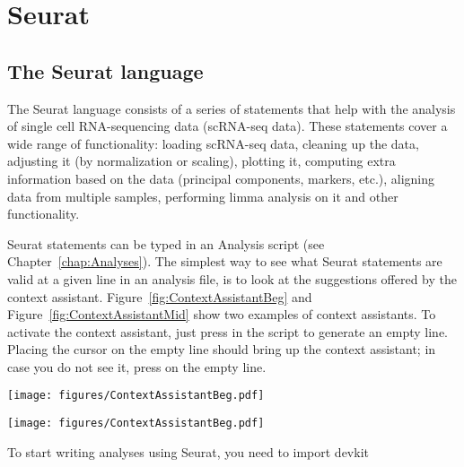 


\chapter{Seurat}\label{chap:Seurat}


\section{The Seurat language}

The Seurat language consists of a series of statements that help with the analysis of
single cell RNA-sequencing data (scRNA-seq data). These statements cover a wide range of
functionality: loading scRNA-seq data, cleaning up the data, adjusting it (by normalization
or scaling), plotting it, computing extra information based on the data (principal components, markers,
etc.), aligning data from multiple samples, performing limma analysis on it and other
functionality.

Seurat statements can be typed in an Analysis script (see Chapter~\ref{chap:Analyses}).
The simplest way to see what Seurat statements are valid at a given line in an
analysis file, is to look at the suggestions offered by the context assistant. Figure~\ref{fig:ContextAssistantBeg}
and Figure~\ref{fig:ContextAssistantMid} show two examples of context assistants.
To activate the context assistant, just press
\keys{\return} in the script to generate an empty line. Placing the cursor on the empty line should
bring up the context assistant; in case you do not see it, press \keys{\space} on the empty line.

\begin{SCfigure}
  \centering
  \texttt{[image: figures/ContextAssistantBeg.pdf]}
\caption[]{}
\label{fig:ContextAssistantBeg.pdf}
\end{SCfigure}

\begin{SCfigure}
  \centering
  \texttt{[image: figures/ContextAssistantBeg.pdf]}
\caption[]{}
\label{fig:ContextAssistantBeg.pdf}
\end{SCfigure}

To start writing analyses using Seurat, you need to import devkit 

